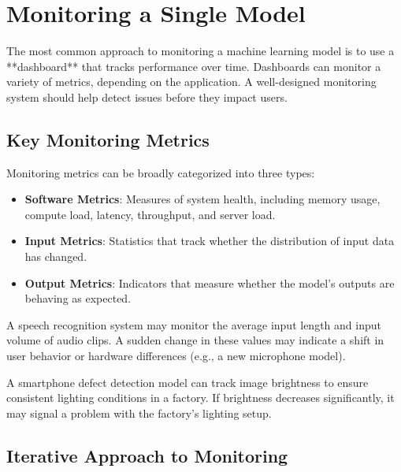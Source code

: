 \documentclass[12pt,openany]{book}
\begin{document}
\section{Monitoring a Single Model}

The most common approach to monitoring a machine learning model is to use a **dashboard** that tracks performance over time. Dashboards can monitor a variety of metrics, depending on the application. A well-designed monitoring system should help detect issues before they impact users.


\subsection{Key Monitoring Metrics}

Monitoring metrics can be broadly categorized into three types:

\begin{itemize}
    \item \textbf{Software Metrics}: Measures of system health, including memory usage, compute load, latency, throughput, and server load.
    \item \textbf{Input Metrics}: Statistics that track whether the distribution of input data has changed.
    \item \textbf{Output Metrics}: Indicators that measure whether the model's outputs are behaving as expected.
\end{itemize}

\noindent\begin{minipage}{\textwidth}
\begin{examplebox}
   A speech recognition system may monitor the average input length and input volume of audio clips. A sudden change in these values may indicate a shift in user behavior or hardware differences (e.g., a new microphone model).
\end{examplebox}
\end{minipage}

\begin{examplebox}
   A smartphone defect detection model can track image brightness to ensure consistent lighting conditions in a factory. If brightness decreases significantly, it may signal a problem with the factory's lighting setup.
\end{examplebox}


\subsection{Iterative Approach to Monitoring}
\end{document}

